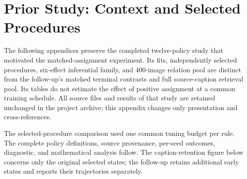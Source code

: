 \clearpage
\section{Prior Study: Context and Selected Procedures}
\label{app:priorstudy}
The following appendices preserve the completed twelve-policy study that motivated the matched-assignment experiment. Its fits, independently selected procedures, six-effect inferential family, and 400-image relation pool are distinct from the follow-up's matched terminal contrasts and full source-caption retrieval pool. Its tables do not estimate the effect of positive assignment at a common training schedule. All source files and results of that study are retained unchanged in the project archive; this appendix changes only presentation and cross-references.





The selected-procedure comparison used one common tuning budget per rule. The complete policy definitions, source provenance, per-seed outcomes, diagnostic, and mathematical analysis follow. The caption-retention figure below concerns only the original selected states; the follow-up retains additional early states and reports their trajectories separately.

